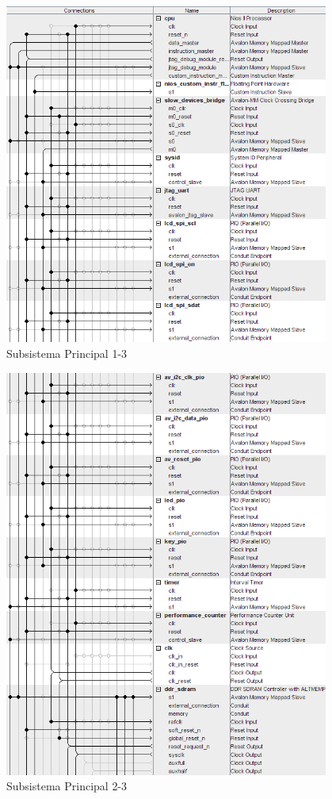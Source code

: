 \documentclass[a4paper,12pt,titlepage,final]{book}
\begin{document}
\begin{figure}[p]
\centering
\includegraphics[height=0.95\textheight,
width=0.95\textwidth]{./figuras/SistemaPrincipal/sistemaprincipalpagina1.png}
\caption{Subsistema Principal 1-3}
\label{fig:Subsistema Principal 1-3}
\end{figure}

\begin{figure}[p]
\centering
\includegraphics[height=0.95\textheight,
width=0.95\textwidth]{./figuras/SistemaPrincipal/sistemaprincipalpagina2.png}
\caption{Subsistema Principal 2-3}
\label{fig:Subsistema Principal 2-3}
\end{figure}
\end{document}
